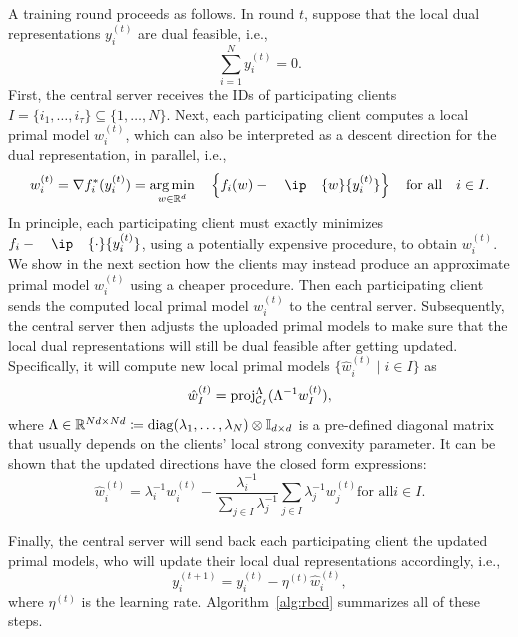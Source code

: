 A training round proceeds as follows. In round $t$, suppose that the local dual representations $y_i^{(t)}$ are dual feasible, i.e., 
\[\sum_{i=1}^N y_i^{(t)} = 0.\]
First, the central server receives the IDs of participating clients $I = \{i_1, \dots, i_\tau\} \subseteq \{1,\dots,N\}$. Next, each participating client computes a local primal model $w_i^{(t)}$, which can also be interpreted as a descent direction for the dual representation, in parallel, i.e., 
\begin{equation} \label{eq:exact_gradient}
    w_i^{(t)} = \nabla f_i^*(y_i^{(t)}) =  \argmin{w \in \Real^d}\enspace \left\{ f_i(w) - \ip{w}{y_i^{(t)}} \right\}  \text{for all} i \in I.
\end{equation}
In principle, each participating client must exactly minimizes $f_i - \ip{\cdot}{y_i^{(t)}}$, using a potentially expensive procedure, to obtain $w_i^{(t)}$. We show in the next section how the clients may instead produce an approximate primal model $w_i^{(t)}$ using a cheaper procedure.
Then each participating client sends the computed local primal model $w_i^{(t)}$ to the central server. Subsequently, the central server then adjusts the uploaded primal models to make sure that the local dual representations will still be dual feasible after getting updated. Specifically, it will compute new local primal models $\{\hat w_i^{(t)} \mid i \in I\}$ as 
\begin{equation} \label{eq:direction_adjust2}
    \hat w_I^{(t)} = \operatorname{proj}_{\mathcal{C}_I}^{\Lambda}(\Lambda^{-1}w_I^{(t)}), 
\end{equation}
where $\Lambda\in\mathbb{R}^{Nd \times Nd} \coloneqq \operatorname{diag}( \lambda_1, \ldots, \lambda_N ) \otimes \mathbb{I}_{d\times d}$ is a pre-defined diagonal matrix that usually depends on the clients' local strong convexity parameter. It can be shown that the updated directions have the closed form expressions:
\begin{equation*} %
    \hat w_i^{(t)} = \lambda_i^{-1}  w_i^{(t)} - \frac{\lambda_i^{-1}}{\sum_{j \in I} \lambda_j^{-1}}\sum_{j \in I} \lambda_j^{-1} w_j^{(t)}  \text{for all} i \in I. 
\end{equation*}

Finally, the central server will send back each participating client the updated primal models, who will update their local dual representations accordingly, i.e.,
\[y_i^{(t+1)} = y_i^{(t)} - \eta^{(t)}\hat w_i^{(t)},\]
where $\eta^{(t)}$ is the learning rate. Algorithm~\ref{alg:rbcd} summarizes all of these steps.  

